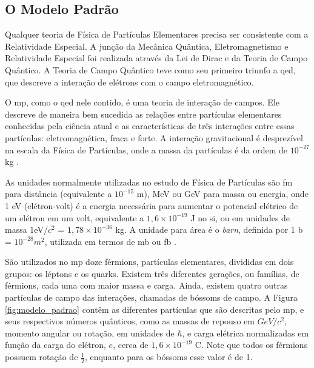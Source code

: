 
\subsection{O Modelo Padrão}
\label{ssec:mp}

Qualquer teoria de Física de Partículas Elementares precisa ser consistente com
a Relatividade Especial. A junção da Mecânica Quântica, Eletromagnetismo e
Relatividade Especial foi realizada através da Lei de Dirac e da Teoria de
Campo Quântico. A Teoria de Campo Quântico teve como seu primeiro triunfo a
\gls{qed}, que descreve a interação de elétrons com o campo
eletromagnético. 

O \gls{mp}, como o \gls{qed} nele contido, é uma teoria de
interação de campos. Ele descreve de maneira 
bem sucedida as relações entre
partículas elementares conhecidas pela ciência atual 
\cite{Intro_Nuclear} e as características de
três interações entre essas partículas:
eletromagnética, fraca e forte. A interação gravitacional é
desprezível na escala da Física de Partículas, onde a massa da partículas é da
ordem de $10^{-27}$ kg \cite{Intro_Standard}.


As unidades normalmente utilizadas no estudo de Física de Partículas são fm para
distância (equivalente a $10^{-15}$ m), MeV ou GeV para massa ou energia, onde 1
eV (elétron-volt) é a energia necessária para aumentar o potencial elétrico de
um elétron em um volt, equivalente a $1,6\times10^{-19}$ J no \gls{si}, ou em unidades
de massa 1eV/$c^2$ = $1,78\times10^{-36}$ kg. A unidade para
área é o \emph{barn}, definida por 1 b = $10^{-28} m^2$, utilizada em
termos de mb ou fb \cite{Intro_Nuclear}.

São utilizados no \gls{mp} doze férmions, partículas elementares, divididas em dois grupos: os
léptons e os quarks. Existem três diferentes gerações, ou famílias, de férmions, cada uma com maior
massa e carga. Ainda, existem quatro outras partículas de campo das
interações, chamadas de bóssoms de campo.
A Figura \ref{fig:modelo_padrao} contêm as diferentes partículas que são
descritas pelo \gls{mp}, e seus respectivos números quânticos, como as massas de repouso em $GeV/c^2$, momento
angular ou rotação, em unidades de $\hbar$, e carga elétrica normalizadas em função da carga
do elétron, $e$, cerca de $1,6\times10^{-19}$ C. Note que todos os férmions
possuem rotação de $\frac{1}{2}$, enquanto para os bóssoms esse valor é de 1.

